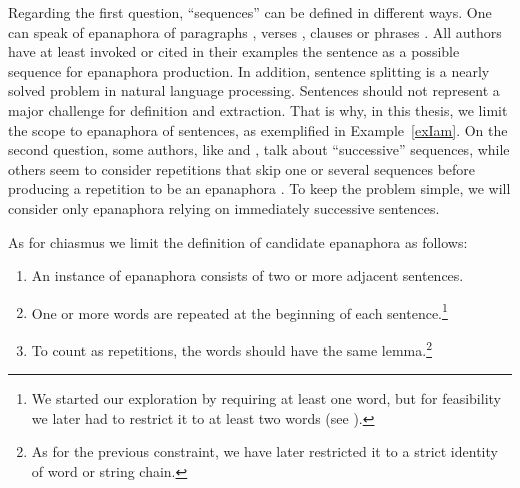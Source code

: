 Regarding the first question, ``sequences'' can be defined in different ways. One can speak of epanaphora of paragraphs \citep[Art. L'anaphore et l'épiphore]{Bacry1992}, verses \citep[Chap. III]{Suhamy2004}, clauses or phrases \citep[Art. Anaphore]{gradus}. All authors have at least invoked or cited in their examples the sentence as a possible sequence for epanaphora production. In addition, sentence splitting is a nearly solved problem in natural language processing. Sentences should not represent a major challenge for definition and extraction. That is why, in this thesis, we limit the scope to epanaphora of sentences, as exemplified in  Example~\ref{exIam}. 
%
%
%
On the second question, some authors, like \citet[Chap. III]{Suhamy2004} and \citet[Art. L'anaphore et l'épiphore]{Bacry1992}, talk about ``successive'' sequen\-ces, while others seem to consider repetitions that skip one or several sequences before producing a repetition to be an epanaphora \cite[p.329]{font}. To keep the problem simple, we will consider only epanaphora relying on immediately successive sentences.


As for chiasmus we limit the definition of candidate epanaphora as follows:

\begin{enumerate}
\vspace{0.2cm}
\item An instance of epanaphora consists of two or more adjacent sentences.
%
\item One or more words are repeated at the beginning of each sentence.\footnote{We started our exploration by requiring at least one word, but for feasibility we later had to restrict it to at least two words (see ).}%
\item To count as repetitions, the words should have the same lemma.\footnote{As for the previous constraint, we have later restricted it to a strict identity of word or string chain.}
\end{enumerate}

